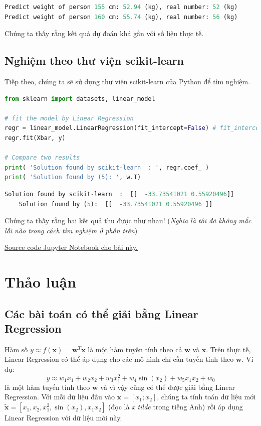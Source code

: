 \begin{lstlisting}[language=Python]
Predict weight of person 155 cm: 52.94 (kg), real number: 52 (kg) 
Predict weight of person 160 cm: 55.74 (kg), real number: 56 (kg) 
\end{lstlisting}
 
 
Chúng ta thấy rằng kết quả dự đoán khá gần với số liệu thực tế. 
 
 
\subsection{Nghiệm theo thư viện scikit-learn}
 
Tiếp theo, chúng ta sẽ sử dụng thư viện scikit-learn của Python để tìm nghiệm.  
 
 
\begin{lstlisting}[language=Python]
from sklearn import datasets, linear_model 
 
# fit the model by Linear Regression 
regr = linear_model.LinearRegression(fit_intercept=False) # fit_intercept = False for calculating the bias 
regr.fit(Xbar, y) 
 
# Compare two results 
print( 'Solution found by scikit-learn  : ', regr.coef_ ) 
print( 'Solution found by (5): ', w.T) 
\end{lstlisting}
 
\begin{lstlisting}[language=Python]
    Solution found by scikit-learn  :  [[  -33.73541021 0.55920496]] 
    Solution found by (5):  [[  -33.73541021 0.55920496 ]] 
\end{lstlisting}
 
Chúng ta thấy rằng hai kết quả thu được như nhau! (\textit{Nghĩa là tôi đã không mắc lỗi nào trong cách tìm nghiệm ở phần trên}) 
 
\href{https://github.com/tiepvupsu/tiepvupsu.github.io/blob/master/assets/LR/LR.ipynb}{Source code Jupyter Notebook cho bài này.} 
 
 
 
\section{Thảo luận}
 
 
\subsection{Các bài toán có thể giải bằng Linear Regression}
Hàm số $y \approx f(\mathbf{x})= \mathbf{w}^T\mathbf{x}$ là một hàm tuyến tính theo cả $ \mathbf{w}$ và $\mathbf{x}$. Trên thực tế, Linear Regression có thể áp dụng cho các mô hình chỉ cần tuyến tính theo $\mathbf{w}$. Ví dụ: 
$$ 
y \approx w_1 x_1 + w_2 x_2 + w_3 x_1^2 +  w_4 \sin(x_2) + w_5 x_1x_2 + w_0 
$$ 
là một hàm tuyến tính theo $\mathbf{w}$ và vì vậy cũng có thể được giải bằng Linear Regression. Với mỗi dữ liệu đầu vào $\mathbf{x}=[x_1; x_2] $, chúng ta tính toán dữ liệu mới $\tilde{\mathbf{x}} = [x_1, x_2, x_1^2, \sin(x_2), x_1x_2]$ (đọc là \textit{x tilde} trong tiếng Anh) rồi áp dụng Linear Regression với dữ liệu mới này.  
 
